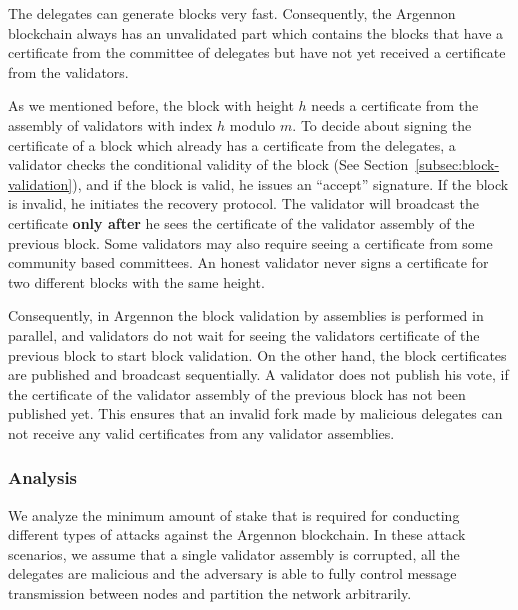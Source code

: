 The delegates can generate blocks very fast. Consequently, the Argennon blockchain always has an
unvalidated part which contains the blocks that have a certificate from the committee of delegates but have not
yet received a certificate from the validators.

As we mentioned before, the block with height $h$ needs a certificate from the assembly of
validators with index $h$ modulo $m$. To decide about signing the certificate of a block which already has
a certificate from the delegates, a validator checks the conditional
validity of the block (See Section~\ref{subsec:block-validation}), and if the block is valid, he issues
an ``accept'' signature. If the block is invalid, he initiates the recovery protocol. The validator will broadcast the
certificate \textbf{only after} he sees the certificate of the validator assembly of the previous block.
Some validators may also require seeing a certificate from
some community based committees. An honest validator never signs a certificate for two different blocks with the
same height.

Consequently, in Argennon the block validation by assemblies is performed in parallel, and validators
do not wait for seeing the validators certificate of the previous block to start block validation. On the
other hand, the block certificates are published and broadcast sequentially. A validator does not publish his vote,
if the certificate of the validator assembly of the previous block has not been published yet. This ensures
that an invalid fork made by malicious delegates can not receive any valid certificates from any validator assemblies.

\subsubsection{Analysis}

We analyze the minimum amount of stake that is required for conducting different types of attacks against the Argennon
blockchain. In these attack scenarios, we assume that a single validator assembly is corrupted, all the delegates
are malicious and the adversary is able to fully control message transmission between nodes and partition the network
arbitrarily.


